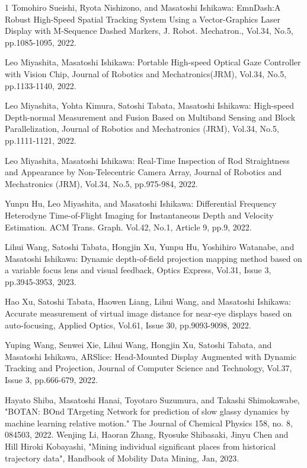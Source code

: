 \begin{雑誌論文}{1}
Tomohiro Sueishi, Ryota Nishizono, and Masatoshi Ishikawa: EmnDash:A Robust High-Speed Spatial Tracking System Using a Vector-Graphics Laser Display with M-Sequence Dashed Markers, J. Robot. Mechatron., Vol.34, No.5, pp.1085-1095, 2022.


Leo Miyashita, Masatoshi Ishikawa: Portable High-speed Optical Gaze Controller with Vision Chip, Journal of Robotics and Mechatronics(JRM), Vol.34, No.5, pp.1133-1140, 2022.

Leo Miyashita, Yohta Kimura, Satoshi Tabata, Masatoshi Ishikawa: High-speed Depth-normal Measurement and Fusion Based on Multiband Sensing and Block Parallelization, Journal of Robotics and Mechatronics (JRM), Vol.34, No.5, pp.1111-1121, 2022.

Leo Miyashita, Masatoshi Ishikawa: Real-Time Inspection of Rod Straightness and Appearance by Non-Telecentric Camera Array, Journal of Robotics and Mechatronics (JRM), Vol.34, No.5, pp.975-984, 2022.

Yunpu Hu, Leo Miyashita, and Masatoshi Ishikawa: Differential Frequency Heterodyne Time-of-Flight Imaging for Instantaneous Depth and Velocity Estimation. ACM Trans. Graph. Vol.42, No.1, Article 9, pp.9, 2022.


Lihui Wang, Satoshi Tabata, Hongjin Xu, Yunpu Hu, Yoshihiro Watanabe, and Masatoshi Ishikawa: Dynamic depth-of-field projection mapping method based on a variable focus lens and visual feedback, Optics Express, Vol.31, Issue 3, pp.3945-3953, 2023.

Hao Xu, Satoshi Tabata, Haowen Liang, Lihui Wang, and Masatoshi Ishikawa: Accurate measurement of virtual image distance for near-eye displays based on auto-focusing, Applied Optics, Vol.61, Issue 30, pp.9093-9098, 2022.

Yuping Wang, Senwei Xie, Lihui Wang, Hongjin Xu, Satoshi Tabata, and Masatoshi Ishikawa, ARSlice: Head-Mounted Display Augmented with Dynamic Tracking and Projection, Journal of Computer Science and Technology, Vol.37, Issue 3, pp.666-679, 2022.


Hayato Shiba, Masatoshi Hanai, Toyotaro Suzumura, and Takashi Shimokawabe, "BOTAN: BOnd TArgeting Network for prediction of slow glassy dynamics by machine learning relative motion." The Journal of Chemical Physics 158, no. 8, 084503, 2022.
Wenjing Li, Haoran Zhang, Ryosuke Shibasaki,  Jinyu Chen and Hill Hiroki Kobayashi,  "Mining individual significant places from historical trajectory data", Handbook of Mobility Data Mining, Jan, 2023.


\end{雑誌論文}

